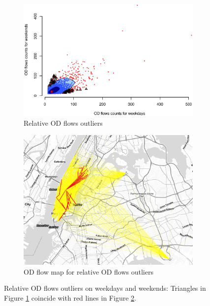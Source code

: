 \documentclass[a4paper,UKenglish]{lipics-v2016}
\begin{document}
\begin{figure}
	\centering
	\begin{subfigure}[b]{0.49\textwidth}
		\includegraphics[width=\textwidth]{images/Outliers_rare_weekdays_weekends.eps}
		\caption{Relative OD flows outliers}
		\label{fig:weekdays_rare}
	\end{subfigure}
	\hfill %
	\begin{subfigure}[b]{0.49\textwidth}
		\includegraphics[width=\textwidth]{images/outliers_rare_weekdays_weekends.png}
		\caption{OD flow map for relative OD flows outliers}
		\label{fig:weekdays_rare_map}
	\end{subfigure}
	\caption{Relative OD flows outliers on weekdays and weekends: Triangles in Figure \ref{fig:weekdays_rare} coincide with red lines in Figure \ref{fig:weekdays_rare_map}. }\label{fig:weekdays_rare_OD_map}	
\end{figure}
\end{document}
